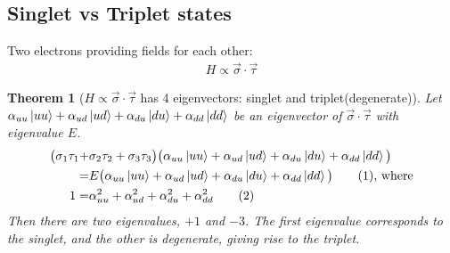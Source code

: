 \documentclass[]{article}
\newcommand\numberthis{\addtocounter{equation}{1}\tag{\theequation}}
\newtheorem{thm}{Theorem}
\begin{document}
\subsection{Singlet vs Triplet states}

Two electrons providing fields for each other:
\begin{align*}
	H \propto \vec{\sigma} \cdot \vec{\tau}
\end{align*}
\begin{thm}	[$H \propto \vec{\sigma} \cdot \vec{\tau}$ has 4 eigenvectors: singlet and triplet(degenerate)]
	Let $\alpha_{uu}\ket{uu} + \alpha_{ud}\ket{ud} +\alpha_{du}\ket{du} + \alpha_{dd}\ket{dd}$ be an eigenvector of $\vec{\sigma} \cdot \vec{\tau}$ with eigenvalue $E$.
	\begin{align*}
		\big(\sigma_1\tau_1 +& \sigma_2\tau_2 + \sigma_3\tau_3\big) \big(\alpha_{uu}\ket{uu} + 	\alpha_{ud}\ket{ud} +\alpha_{du}\ket{du} + \alpha_{dd}\ket{dd}\big) \\=& E \big(\alpha_{uu}\ket{uu} + \alpha_{ud}\ket{ud} +\alpha_{du}\ket{du} + \alpha_{dd}\ket{dd}\big) \numberthis \label{eq:ev_sigma_tau} \text{, where}\\
		1 =& \alpha_{uu}^2 + \alpha_{ud}^2 +\alpha_{du}^2 + \alpha_{dd}^2 \numberthis \label{eq:norm:alpha}
	\end{align*}
Then there are two eigenvalues, $+1$ and $-3$. The first eigenvalue corresponds to the singlet, and the other is degenerate, giving rise to the triplet.
\end{thm}
\end{document}
